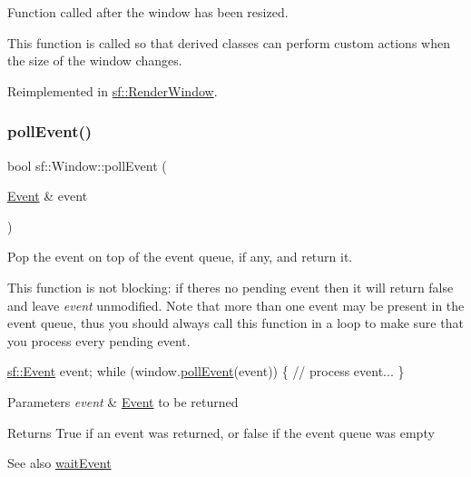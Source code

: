 Function called after the window has been resized. 

This function is called so that derived classes can perform custom actions when the size of the window changes. 

Reimplemented in \hyperlink{classsf_1_1_render_window_a5c85fe482313562d33ffd24a194b6fef}{sf\+::\+Render\+Window}.

\mbox{\label{classsf_1_1_window_a338e996585faf82e93069858e3b531b7}} 
\subsubsection{\texorpdfstring{poll\+Event()}{pollEvent()}}
{\footnotesize\ttfamily bool sf\+::\+Window\+::poll\+Event (\begin{DoxyParamCaption}\item[{\hyperlink{classsf_1_1_event}{Event} \&}]{event }\end{DoxyParamCaption})}



Pop the event on top of the event queue, if any, and return it. 

This function is not blocking\+: if there\textquotesingle{}s no pending event then it will return false and leave {\itshape event} unmodified. Note that more than one event may be present in the event queue, thus you should always call this function in a loop to make sure that you process every pending event. 
\begin{DoxyCode}
\hyperlink{classsf_1_1_event}{sf::Event} event;
\textcolor{keywordflow}{while} (window.\hyperlink{classsf_1_1_window_a338e996585faf82e93069858e3b531b7}{pollEvent}(event))
\{
   \textcolor{comment}{// process event...}
\}
\end{DoxyCode}



\begin{DoxyParams}{Parameters}
{\em event} & \hyperlink{classsf_1_1_event}{Event} to be returned\\
\hline
\end{DoxyParams}
\begin{DoxyReturn}{Returns}
True if an event was returned, or false if the event queue was empty
\end{DoxyReturn}
\begin{DoxySeeAlso}{See also}
\hyperlink{classsf_1_1_window_aaf02ab64fbc1d374eef3696df54137bc}{wait\+Event} 
\end{DoxySeeAlso}
\mbox{\label{classsf_1_1_window_a58cf7fa1775e8e7542032e3ecfa83b49}} 
